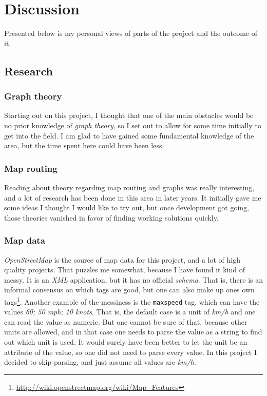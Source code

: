 \documentclass[../main.tex]{subfiles}
\begin{document}
\chapter{Discussion}
Presented below is my personal views of parts of the project and the outcome of it.

\section{Research}
\subsection{Graph theory}
Starting out on this project, I thought that one of the main obstacles would be no prior knowledge of \textit{graph theory}, so I set out to allow for some time initially to get into the field. I am glad to have gained some fundamental knowledge of the area, but the time spent here could have been less.

\subsection{Map routing}
Reading about theory regarding map routing and graphs was really interesting, and a lot of research has been done in this area in later years. It initially gave me some ideas I thought I would like to try out, but once development got going, those theories vanished in favor of finding working solutions quickly.

\subsection{Map data}
\textit{OpenStreetMap} is the source of map data for this project, and a lot of high quality projects. That puzzles me somewhat, because I have found it kind of messy. It is an \textit{XML} application, but it has no official \textit{schema}. That is, there is an informal consensus on which tags are good, but one can also make up ones own tags\footnote{\url{http://wiki.openstreetmap.org/wiki/Map_Features}}. Another example of the messiness is the \texttt{maxspeed} tag, which can have the values \textit{60; 50 mph; 10 knots}. That is, the default case is a unit of \textit{km/h} and one can read the value as numeric. But one cannot be sure of that, because other units are allowed, and in that case one needs to parse the value as a string to find out which unit is used. It would surely have been better to let the unit be an attribute of the value, so one did not need to parse every value. In this project I decided to skip parsing, and just assume all values are \textit{km/h}.
\end{document}
